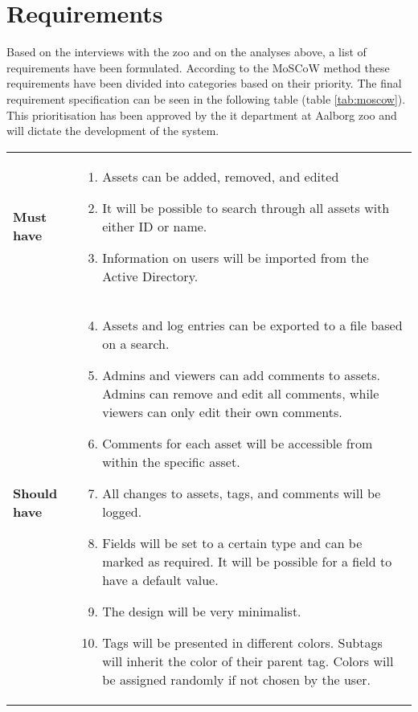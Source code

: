 \section{Requirements}\label{sc:requirements}
Based on the interviews with the zoo and on the analyses above, a list of requirements have been formulated. According to the MoSCoW method these requirements have been divided into categories based on their priority. The final requirement specification can be seen in the following table (table \ref{tab:moscow}). This prioritisation has been approved by the it department at Aalborg zoo and will dictate the development of the system. 

\begin{longtable}{p{3.2cm} p{10cm}}
    \renewcommand{\arraystretch}{2.0}
        \\
        \hline
        \textbf{Must have} & 
        \vspace*{-7mm}
        \begin{enumerate} \itemsep0em 
            \item Assets can be added, removed, and edited
            \item It will be possible to search through all assets with either ID or name.
            \item Information on users will be imported from the Active Directory.
        \end{enumerate}
        \\
        \hline
        
        \textbf{Should have} & 
        \vspace*{-7mm}
        \begin{enumerate} \setcounter{enumi}{3} \itemsep0em 
            \item Assets and log entries can be exported to a file based on a search.
            \item Admins and viewers can add comments to assets. Admins can remove and edit all comments, while viewers can only edit their own comments.
            \item Comments for each asset will be accessible from within the specific asset.
            \item All changes to assets, tags, and comments will be logged.
            \item Fields will be set to a certain type and can be marked as required. It will be possible for a field to have a default value.
            \item The design will be very minimalist.
            \item Tags will be presented in different colors. Subtags will inherit the color of their parent tag. Colors will be assigned randomly if not chosen by the user.
        \end{enumerate}
        \\
        \hline
        

\end{longtable}
